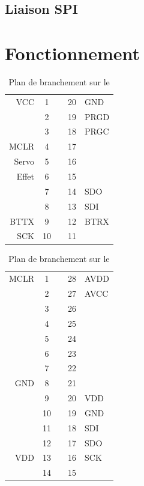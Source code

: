 \documentclass[a4paper,12pt]{book}
\begin{document}
	
			\subsection{Liaison SPI}
		\section{Fonctionnement}
		\begin{table}
			\begin{center}
				\begin{tabular}{r|ccc|l}
	
				VCC		& 1 &   & 20 & GND \\ 
				  		& 2 &   & 19 & PRGD \\ 
				 		& 3 &   & 18 & PRGC \\ 
				MCLR 	& 4 &   & 17 &  \\ 
				Servo 	& 5 &   & 16 &   \\
				 Effet	& 6 &   & 15 &   \\ 
				  		& 7 &   & 14 & SDO \\ 
				  		& 8 &   & 13 & SDI \\ 
				BTTX 	& 9 &   & 12 & BTRX \\ 
				SCK 	& 10&   & 11 &   \\ 
				\end{tabular} 
			\end{center}
			\caption{Plan de branchement sur le \pic}
			\label{pinoutpic}
		\end{table}
		\begin{table}
			\begin{center}
				\begin{tabular}{r|ccc|l}
				MCLR & 1 &   & 28 & AVDD \\ 
				  & 2 &   & 27 & AVCC \\ 
				  & 3 &   & 26 &   \\ 
				  & 4 &   & 25 &   \\ 
				  & 5 &   & 24 &   \\ 
				  & 6 &   & 23 &   \\ 
				 & 7 &   & 22 &   \\ 
				GND & 8 &   & 21 &   \\ 
				  & 9 &   & 20 & VDD \\ 
				  & 10 &   & 19 & GND \\ 
				  & 11 &   & 18 & SDI \\ 
				  & 12 &   & 17 & SDO \\ 
				VDD & 13 &   & 16 & SCK \\ 
				  & 14 &   & 15 &   \\ 
				\end{tabular} 
			\end{center}
			\caption{Plan de branchement sur le \dspic}
			\label{pinoutdspic}
		\end{table}
\end{document}
